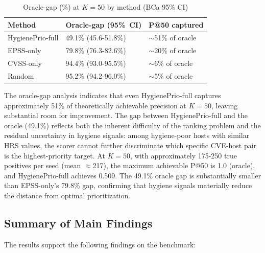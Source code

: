 \begin{table}[!t]
 \caption{Oracle-gap (\%) at $K = 50$ by method (BCa 95\% CI)}
 \label{tab:oracle_gap}
 \centering
 \small
 \setlength{\tabcolsep}{4pt}
 \begin{tabular}{>{\raggedright}p{2.6cm}
 >{\raggedright}p{2.3cm}
 >{\raggedright\arraybackslash}p{2.4cm}}
 \toprule
 \textbf{Method} & \textbf{Oracle-gap (95\%~CI)} & \textbf{P@50 captured} \\
 \midrule
 HygienePrio-full & 49.1\% (45.6-51.8\%) & $\sim$51\% of oracle \\
 EPSS-only & 79.8\% (76.3-82.6\%) & $\sim$20\% of oracle \\
 CVSS-only & 94.4\% (93.0-95.5\%) & $\sim$6\% of oracle \\
 Random & 95.2\% (94.2-96.0\%) & $\sim$5\% of oracle \\
 \bottomrule
 \end{tabular}
\end{table}

The oracle-gap analysis indicates that even HygienePrio-full captures approximately 51\% of theoretically achievable precision at $K=50$, leaving substantial room for improvement. The gap between HygienePrio-full and the oracle (49.1\%) reflects both the inherent difficulty of the ranking problem and the residual uncertainty in hygiene signals: among hygiene-poor hosts with similar HRS values, the scorer cannot further discriminate which specific CVE-host pair is the highest-priority target. At $K=50$, with approximately 175-250 true positives per seed (mean $\approx$217), the maximum achievable P@50 is 1.0 (oracle), and HygienePrio-full achieves 0.509. The 49.1\% oracle gap is substantially smaller than EPSS-only's 79.8\% gap, confirming that hygiene signals materially reduce the distance from optimal prioritization.

\subsection{Summary of Main Findings}

The results support the following findings on the benchmark:

